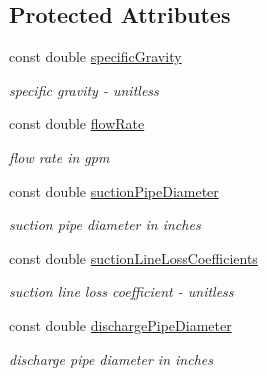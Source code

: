 \subsection*{Protected Attributes}
\begin{DoxyCompactItemize}
\item 
\mbox{\label{class_head_tool_base_ae5af2380fb5db2c25281ef663a5fb65f}} 
const double \hyperlink{class_head_tool_base_ae5af2380fb5db2c25281ef663a5fb65f}{specific\+Gravity}
\begin{DoxyCompactList}\small\item\em specific gravity -\/ unitless \end{DoxyCompactList}\item 
\mbox{\label{class_head_tool_base_acf4c03cb62cbf63aba017ce063989fbc}} 
const double \hyperlink{class_head_tool_base_acf4c03cb62cbf63aba017ce063989fbc}{flow\+Rate}
\begin{DoxyCompactList}\small\item\em flow rate in gpm \end{DoxyCompactList}\item 
\mbox{\label{class_head_tool_base_a357365fc5ef346ce7bcb089c9d1a95e1}} 
const double \hyperlink{class_head_tool_base_a357365fc5ef346ce7bcb089c9d1a95e1}{suction\+Pipe\+Diameter}
\begin{DoxyCompactList}\small\item\em suction pipe diameter in inches \end{DoxyCompactList}\item 
\mbox{\label{class_head_tool_base_ac74c6f6f8ab387efe7b77e0ce6ecd84e}} 
const double \hyperlink{class_head_tool_base_ac74c6f6f8ab387efe7b77e0ce6ecd84e}{suction\+Line\+Loss\+Coefficients}
\begin{DoxyCompactList}\small\item\em suction line loss coefficient -\/ unitless \end{DoxyCompactList}\item 
\mbox{\label{class_head_tool_base_a126a397bd3d87b68864e1962c70bb45e}} 
const double \hyperlink{class_head_tool_base_a126a397bd3d87b68864e1962c70bb45e}{discharge\+Pipe\+Diameter}
\begin{DoxyCompactList}\small\item\em discharge pipe diameter in inches \end{DoxyCompactList}\item 

\end{DoxyCompactItemize}
